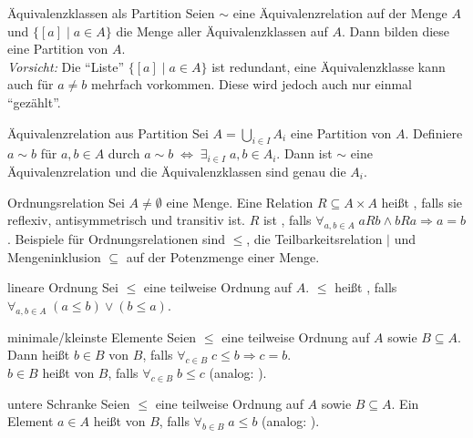 \begin{Satz}{Äquivalenzklassen als Partition}
    Seien $\sim$ eine Äquivalenzrelation auf der Menge $A$ und
    $\{[a] \;|\; a \in A\}$ die Menge aller Äquivalenzklassen auf $A$.
    Dann bilden diese eine Partition von $A$. \\
    \emph{Vorsicht:} Die "`Liste"' $\{[a] \;|\; a \in A\}$ ist redundant, eine
    Äquivalenzklasse kann auch für $a \not= b$ mehrfach vorkommen.
    Diese wird jedoch auch nur einmal "`gezählt"'.
\end{Satz}

\begin{Satz}{Äquivalenzrelation aus Partition}
    Sei $A = \bigcup_{i \in I} A_i$ eine Partition von $A$.
    Definiere $a \sim b$ für $a, b \in A$ durch
    $a \sim b \;\Leftrightarrow\; \exists_{i \in I}\; a, b \in A_i$.
    Dann ist $\sim$ eine Äquivalenzrelation und die Äquivalenzklassen sind
    genau die $A_i$.
\end{Satz}

\begin{Def}{Ordnungsrelation}
    Sei $A \not= \emptyset$ eine Menge.
    Eine Relation $R \subseteq A \times A$ heißt
    ,
    falls sie reflexiv, antisymmetrisch und transitiv ist.
    $R$ ist , falls
    $\forall_{a, b \in A}\; aRb \land bRa \Rightarrow a = b$.
    Beispiele für Ordnungsrelationen sind $\le$, die Teilbarkeitsrelation $|$
    und Mengeninklusion $\subseteq$ auf der Potenzmenge einer Menge.
\end{Def}

\begin{Def}{lineare Ordnung}
    Sei $\le$ eine teilweise Ordnung auf $A$.
    $\le$ heißt , falls
    $\forall_{a, b \in A}\; (a \le b) \lor (b \le a)$.
\end{Def}

\begin{Def}{minimale/kleinste Elemente}
    Seien $\le$ eine teilweise Ordnung auf $A$ sowie $B \subseteq A$. \\
    Dann heißt $b \in B$  von $B$, falls
    $\forall_{c \in B}\; c \le b \Rightarrow c = b$. \\
    $b \in B$ heißt  von $B$, falls
    $\forall_{c \in B}\; b \le c$
    (analog: ).
\end{Def}

\begin{Def}{untere Schranke}
    Seien $\le$ eine teilweise Ordnung auf $A$ sowie $B \subseteq A$.
    Ein Element $a \in A$ heißt  von $B$,
    falls $\forall_{b \in B}\; a \le b$
    (analog: ).
\end{Def}

